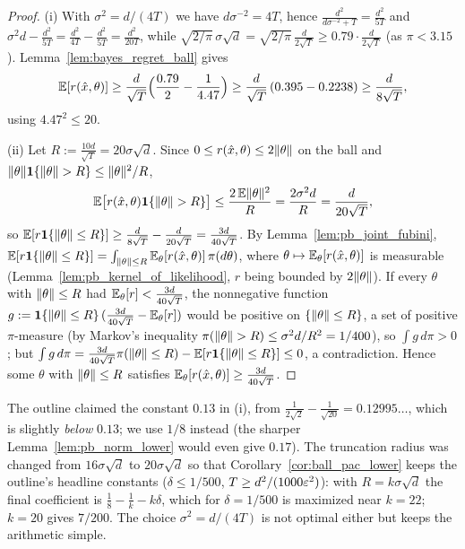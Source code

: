 \begin{proof}
\leanok
{}
(i) With $\sigma^2 = d/(4T)$ we have $d\sigma^{-2} = 4T$, hence
$\frac{d^2}{d\sigma^{-2}+T} = \frac{d^2}{5T}$ and $\sigma^2d-\frac{d^2}{5T} = \frac{d^2}{4T}-\frac{d^2}{5T} = \frac{d^2}{20T}$,
while $\sqrt{2/\pi}\,\sigma\sqrt d = \sqrt{2/\pi}\,\frac{d}{2\sqrt T} \ge 0.79\cdot\frac{d}{2\sqrt T}$
(as $\pi < 3.15$). Lemma~\ref{lem:bayes_regret_ball} gives
\[
  \mathbb{E}[r(\hat{x},\theta)]\ge\frac{d}{\sqrt T}\Big(\frac{0.79}{2}-\frac{1}{4.47}\Big)
  \ge\frac{d}{\sqrt T}\,(0.395-0.2238) \ge \frac{d}{8\sqrt T} ,
\]
using $4.47^2 \le 20$.

(ii) Let $R := \frac{10d}{\sqrt T} = 20\sigma\sqrt d$.
Since $0 \le r(\hat{x},\theta)\le2\lVert \theta \rVert$ on the ball and
$\lVert \theta \rVert\mathbf{1}\{\lVert \theta \rVert>R\}\le\lVert \theta \rVert^2/R$,
\[
  \mathbb{E}\big[r(\hat{x},\theta)\mathbf{1}\{\lVert \theta \rVert>R\}\big]\le\frac{2\,\mathbb{E}\lVert \theta \rVert^2}{R}
  = \frac{2\sigma^2d}{R} = \frac{d}{20\sqrt T} ,
\]
so $\mathbb{E}[r\mathbf{1}\{\lVert \theta \rVert\le R\}] \ge \frac{d}{8\sqrt T}-\frac{d}{20\sqrt T} = \frac{3d}{40\sqrt T}$.
By Lemma~\ref{lem:pb_joint_fubini}, $\mathbb{E}[r\mathbf{1}\{\lVert \theta \rVert\le R\}] = \int_{\lVert \theta \rVert\le R}\mathbb{E}_\theta[r(\hat{x},\theta)]\,\pi(d\theta)$,
where $\theta\mapsto\mathbb{E}_\theta[r(\hat{x},\theta)]$ is measurable
(Lemma~\ref{lem:pb_kernel_of_likelihood}, $r$ being bounded by $2\lVert \theta \rVert$).
If every $\theta$ with $\lVert \theta \rVert\le R$ had $\mathbb{E}_\theta[r]<\frac{3d}{40\sqrt T}$, the
nonnegative function $g := \mathbf{1}\{\lVert \theta \rVert\le R\}\,(\frac{3d}{40\sqrt T} - \mathbb{E}_\theta[r])$
would be positive on $\{\lVert \theta \rVert\le R\}$, a set of positive $\pi$-measure (by Markov's
inequality $\pi(\lVert \theta \rVert>R)\le\sigma^2d/R^2 = 1/400$), so $\int g\,d\pi > 0$; but
$\int g\,d\pi = \frac{3d}{40\sqrt T}\pi(\lVert \theta \rVert\le R) - \mathbb{E}[r\mathbf{1}\{\lVert \theta \rVert\le R\}] \le 0$,
a contradiction. Hence some $\theta$ with $\lVert \theta \rVert\le R$ satisfies
$\mathbb{E}_\theta[r(\hat{x},\theta)]\ge\frac{3d}{40\sqrt T}$.
\end{proof}

\begin{remark}[Constants]\label{rem:pb_constants}
The outline claimed the constant $0.13$ in (i), from
$\frac{1}{2\sqrt2}-\frac{1}{\sqrt{20}} = 0.12995\ldots$, which is slightly \emph{below} $0.13$; we
use $1/8$ instead (the sharper Lemma~\ref{lem:pb_norm_lower} would even give $0.17$). The
truncation radius was changed from $16\sigma\sqrt d$ to $20\sigma\sqrt d$
so that Corollary~\ref{cor:ball_pac_lower} keeps the outline's headline constants
($\delta\le1/500$, $T\ge d^2/(1000\varepsilon^2)$): with $R = k\sigma\sqrt d$ the final coefficient is
$\frac18-\frac1k-k\delta$, which for $\delta = 1/500$ is maximized near $k = 22$; $k = 20$ gives
$7/200$. The choice $\sigma^2 = d/(4T)$ is not optimal either but keeps the arithmetic simple.
\end{remark}

